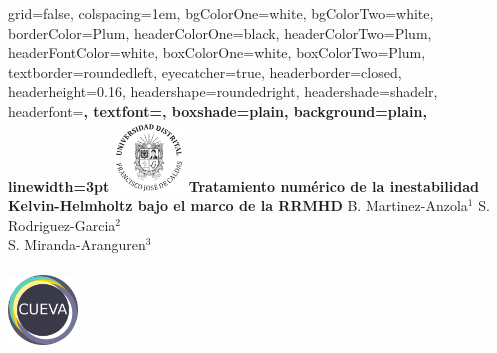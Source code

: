 \documentclass[portrait,final,a0paper,fontscale=0.277]{baposter}
\begin{document}
\begin{poster}%
  {
  grid=false,
  colspacing=1em,
  bgColorOne=white,
  bgColorTwo=white,
  borderColor=Plum,
  headerColorOne=black,
  headerColorTwo=Plum,
  headerFontColor=white,
  boxColorOne=white,
  boxColorTwo=Plum,
  textborder=roundedleft,
  eyecatcher=true,
  headerborder=closed,
  headerheight=0.16\textheight,
  headershape=roundedright,
  headershade=shadelr,
  headerfont=\Large\bf\textsc, %
  textfont={\setlength{\parindent}{1.5em}},
  boxshade=plain,
  background=plain,
  linewidth=3pt
  }
  {\hspace*{-0.3cm} \includegraphics[height=5em]{images/logo_circular_negro.png}} 
  {\hspace*{-0.6cm}  \bf{Tratamiento numérico de la inestabilidad \\\vspace{0.3cm}Kelvin-Helmholtz bajo el marco de la RRMHD} \vspace{0.1em}}
  { \vspace{0.3cm} \hspace{-1.0cm} B. Martinez-Anzola$^{1}$ \hspace{0.2cm} S. Rodriguez-Garcia$^{2}$ \hspace{0.2cm} \\ S. Miranda-Aranguren$^{3}$  \\ [-0.2em]
  {\hspace{0.2cm}}\\[0.4em]
  }
  {%
    \includegraphics[height=5em]{images/cueva_logo.png}
}
\end{poster}
\end{document}
